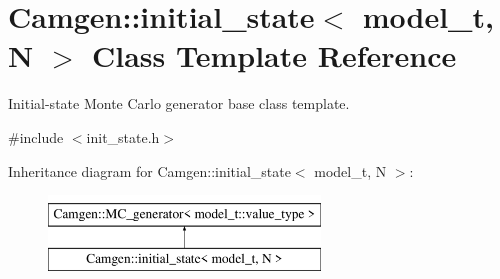 \hypertarget{a00304}{\section{Camgen\-:\-:initial\-\_\-state$<$ model\-\_\-t, N $>$ Class Template Reference}
\label{a00304}
}


Initial-\/state Monte Carlo generator base class template.  




{\ttfamily \#include $<$init\-\_\-state.\-h$>$}

Inheritance diagram for Camgen\-:\-:initial\-\_\-state$<$ model\-\_\-t, N $>$\-:\begin{figure}[H]
\begin{center}
\leavevmode
\includegraphics[height=2.000000cm]{a00304}
\end{center}
\end{figure}
